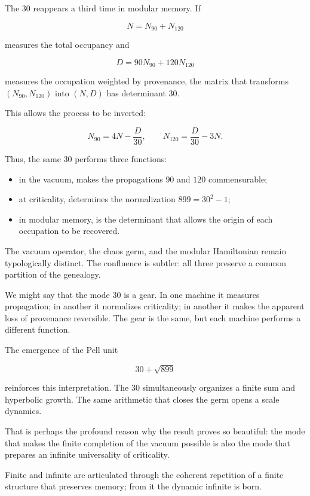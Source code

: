 The \(30\) reappears a third time in modular memory. If\par

\[
N=N_{90}+N_{120}
\]

measures the total occupancy and\par

\[
D=90N_{90}+120N_{120}
\]

measures the occupation weighted by provenance, the matrix that transforms \((N_{90},N_{120})\) into \((N,D)\) has determinant \(30\).\par

This allows the process to be inverted:\par

\[
N_{90}=4N-\frac D{30},
\qquad
N_{120}=\frac D{30}-3N.
\]

Thus, the same \(30\) performs three functions:\par

\begin{itemize}[leftmargin=*,itemsep=0.35em]
\item in the vacuum, makes the propagations \(90\) and \(120\) commensurable;
\item at criticality, determines the normalization \(899=30^2-1\);
\item in modular memory, is the determinant that allows the origin of each occupation to be recovered.
\end{itemize}

The vacuum operator, the chaos germ, and the modular Hamiltonian remain typologically distinct. The confluence is subtler: all three preserve a common partition of the genealogy.\par

We might say that the mode \(30\) is a gear. In one machine it measures propagation; in another it normalizes criticality; in another it makes the apparent loss of provenance reversible. The gear is the same, but each machine performs a different function.\par

The emergence of the Pell unit\par

\[
30+\sqrt{899}
\]

reinforces this interpretation. The \(30\) simultaneously organizes a finite sum and hyperbolic growth. The same arithmetic that closes the germ opens a scale dynamics.\par

That is perhaps the profound reason why the result proves so beautiful: the mode that makes the finite completion of the vacuum possible is also the mode that prepares an infinite universality of criticality.\par

Finite and infinite are articulated through the coherent repetition of a finite structure that preserves memory; from it the dynamic infinite is born.\par

